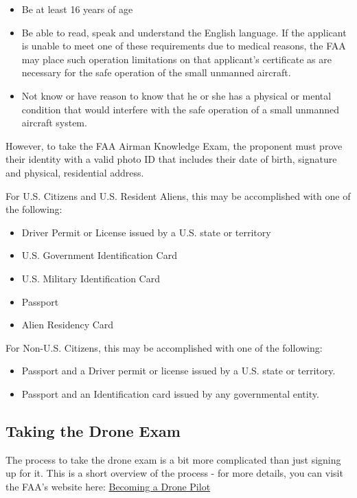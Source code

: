 \documentclass[
  12pt,
]{book}
\providecommand{\tightlist}{%
  \setlength{\itemsep}{0pt}\setlength{\parskip}{0pt}}
\begin{document}
\begin{itemize}
\tightlist
\item
  Be at least 16 years of age
\item
  Be able to read, speak and understand the English language. If the applicant is unable to meet one of these requirements due to medical reasons, the FAA may place such operation limitations on that applicant's certificate as are necessary for the safe operation of the small unmanned aircraft.
\item
  Not know or have reason to know that he or she has a physical or mental condition that would interfere with the safe operation of a small unmanned aircraft system.
\end{itemize}

However, to take the FAA Airman Knowledge Exam, the proponent must prove their identity with a valid photo ID that includes their date of birth, signature and physical, residential address.

For U.S. Citizens and U.S. Resident Aliens, this may be accomplished with one of the following:

\begin{itemize}
\tightlist
\item
  Driver Permit or License issued by a U.S. state or territory
\item
  U.S. Government Identification Card
\item
  U.S. Military Identification Card
\item
  Passport
\item
  Alien Residency Card
\end{itemize}

For Non-U.S. Citizens, this may be accomplished with one of the following:

\begin{itemize}
\tightlist
\item
  Passport and a Driver permit or license issued by a U.S. state or territory.
\item
  Passport and an Identification card issued by any governmental entity.
\end{itemize}

\hypertarget{taking-the-drone-exam}{%
\subsection{Taking the Drone Exam}\label{taking-the-drone-exam}}

The process to take the drone exam is a bit more complicated than just signing up for it. This is a short overview of the process - for more details, you can visit the FAA's website here: \href{https://www.faa.gov/uas/commercial_operators/become_a_drone_pilot/}{Becoming a Drone Pilot}
\end{document}
